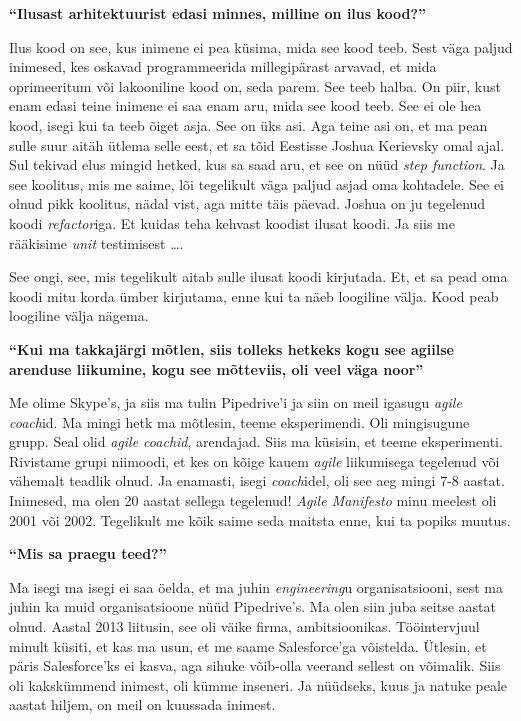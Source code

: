 \textbf{\enquote{Ilusast arhitektuurist edasi minnes, milline on ilus kood?}}

Ilus kood on see, kus inimene ei pea küsima, mida see kood teeb. Sest väga 
paljud inimesed, kes oskavad programmeerida millegipärast arvavad, et mida 
oprimeeritum või lakooniline kood on, seda parem. See teeb halba. On piir, kust 
enam edasi teine inimene ei saa enam aru, mida see kood teeb. See ei ole hea 
kood, isegi kui ta teeb õiget asja. See on üks asi. Aga teine asi on, et ma 
pean sulle suur aitäh ütlema selle eest, et sa tõid Eestisse Joshua 
Kerievsky omal ajal. Sul tekivad elus mingid hetked, kus sa saad aru, 
et see on nüüd \emph{step function}. Ja see koolitus, mis me saime, lõi 
tegelikult väga paljud asjad oma kohtadele. See ei olnud pikk koolitus, nädal 
vist, aga mitte täis päevad. Joshua on ju tegelenud koodi \emph{refactor}iga. 
Et kuidas teha kehvast koodist ilusat koodi. Ja siis me rääkisime \emph{unit} 
testimisest \ldots.

See ongi, see, mis tegelikult aitab sulle ilusat koodi kirjutada. Et, et sa 
pead oma koodi mitu korda ümber kirjutama, enne kui ta näeb loogiline välja. 
Kood peab loogiline välja nägema.

\textbf{\enquote{Kui ma takkajärgi mõtlen, siis tolleks hetkeks kogu see 
agiilse arenduse liikumine, kogu see mõtteviis, oli veel väga noor}}

Me olime Skype's, ja siis ma tulin Pipedrive'i ja siin on meil 
igasugu \emph{agile coach}id. Ma mingi hetk ma mõtlesin, teeme eksperimendi. 
Oli mingisugune grupp. Seal olid \emph{agile coachid}, arendajad. Siis ma 
küsisin, et teeme eksperimenti. Rivistame grupi niimoodi, et kes on kõige kauem 
\emph{agile} liikumisega tegelenud  või vähemalt teadlik olnud. Ja enamasti, 
isegi \emph{coach}idel, oli see aeg mingi 7-8 aastat. Inimesed, ma olen 20 
aastat sellega tegelenud! \emph{Agile Manifesto} minu meelest oli 2001 või 
2002. Tegelikult me kõik saime seda maitsta enne, kui ta popiks muutus.

\textbf{\enquote{Mis sa praegu teed?}}

Ma isegi ma isegi ei saa öelda, et ma juhin \emph{engineering}u 
organisatsiooni, sest ma juhin ka muid organisatsioone nüüd 
Pipedrive's. Ma olen siin juba seitse aastat olnud. Aastal 
2013 liitusin, see oli väike firma, ambitsioonikas. Tööintervjuul minult 
küsiti, et kas ma usun, et me saame Salesforce'ga võistelda. Ütlesin, et päris 
Salesforce'ks ei kasva, aga sihuke võib-olla veerand sellest on võimalik. Siis 
oli kakskümmend inimest, oli kümme inseneri. Ja nüüdseks, kuus ja natuke peale 
aastat hiljem, on meil on kuussada inimest.

